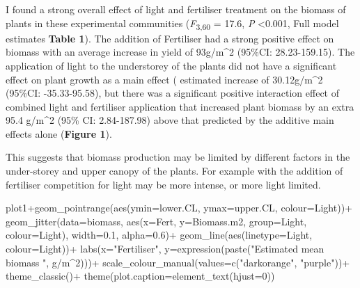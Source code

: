 \documentclass[
]{article}
\newenvironment{Shaded}{\begin{snugshade}}{\end{snugshade}}
\newcommand{\AttributeTok}[1]{\textcolor[rgb]{0.77,0.63,0.00}{#1}}
\newcommand{\DecValTok}[1]{\textcolor[rgb]{0.00,0.00,0.81}{#1}}
\newcommand{\FloatTok}[1]{\textcolor[rgb]{0.00,0.00,0.81}{#1}}
\newcommand{\FunctionTok}[1]{\textcolor[rgb]{0.00,0.00,0.00}{#1}}
\newcommand{\NormalTok}[1]{#1}
\newcommand{\SpecialCharTok}[1]{\textcolor[rgb]{0.00,0.00,0.00}{#1}}
\newcommand{\StringTok}[1]{\textcolor[rgb]{0.31,0.60,0.02}{#1}}
\begin{document}
I found a strong overall effect of light and fertiliser treatment on the
biomass of plants in these experimental communities
(\emph{F}\textsubscript{3,60} = 17.6, \emph{P} \textless0.001, Full
model estimates \textbf{Table 1}). The addition of Fertiliser had a
strong positive effect on biomass with an average increase in yield of
93g/m\^{}2 (95\%CI: 28.23-159.15). The application of light to the
understorey of the plants did not have a significant effect on plant
growth as a main effect ( estimated increase of 30.12g/m\^{}2 (95\%CI:
-35.33-95.58), but there was a significant positive interaction effect
of combined light and fertiliser application that increased plant
biomass by an extra 95.4 g/m\^{}2 (95\% CI: 2.84-187.98) above that
predicted by the additive main effects alone (\textbf{Figure 1}).

This suggests that biomass production may be limited by different
factors in the under-storey and upper canopy of the plants. For example
with the addition of fertiliser competition for light may be more
intense, or more light limited.

\begin{Shaded}
\begin{Highlighting}[]
\NormalTok{plot1}\SpecialCharTok{+}\FunctionTok{geom\_pointrange}\NormalTok{(}\FunctionTok{aes}\NormalTok{(}\AttributeTok{ymin=}\NormalTok{lower.CL, }
                      \AttributeTok{ymax=}\NormalTok{upper.CL,}
                      \AttributeTok{colour=}\NormalTok{Light))}\SpecialCharTok{+}
  \FunctionTok{geom\_jitter}\NormalTok{(}\AttributeTok{data=}\NormalTok{biomass, }\FunctionTok{aes}\NormalTok{(}\AttributeTok{x=}\NormalTok{Fert, }
                                \AttributeTok{y=}\NormalTok{Biomass.m2,}
                                \AttributeTok{group=}\NormalTok{Light,}
                                \AttributeTok{colour=}\NormalTok{Light),}
              \AttributeTok{width=}\FloatTok{0.1}\NormalTok{, }
              \AttributeTok{alpha=}\FloatTok{0.6}\NormalTok{)}\SpecialCharTok{+}
   \FunctionTok{geom\_line}\NormalTok{(}\FunctionTok{aes}\NormalTok{(}\AttributeTok{linetype=}\NormalTok{Light, }\AttributeTok{colour=}\NormalTok{Light))}\SpecialCharTok{+}
  \FunctionTok{labs}\NormalTok{(}\AttributeTok{x=}\StringTok{"Fertiliser"}\NormalTok{,}
       \AttributeTok{y=}\FunctionTok{expression}\NormalTok{(}\FunctionTok{paste}\NormalTok{(}\StringTok{"Estimated mean biomass "}\NormalTok{, g}\SpecialCharTok{/}\NormalTok{m}\SpecialCharTok{\^{}}\DecValTok{2}\NormalTok{)))}\SpecialCharTok{+}
  \FunctionTok{scale\_colour\_manual}\NormalTok{(}\AttributeTok{values=}\FunctionTok{c}\NormalTok{(}\StringTok{"darkorange"}\NormalTok{, }\StringTok{"purple"}\NormalTok{))}\SpecialCharTok{+}
  \FunctionTok{theme\_classic}\NormalTok{()}\SpecialCharTok{+}
     \FunctionTok{theme}\NormalTok{(}\AttributeTok{plot.caption=}\FunctionTok{element\_text}\NormalTok{(}\AttributeTok{hjust=}\DecValTok{0}\NormalTok{))}
\end{Highlighting}
\end{Shaded}
\end{document}
